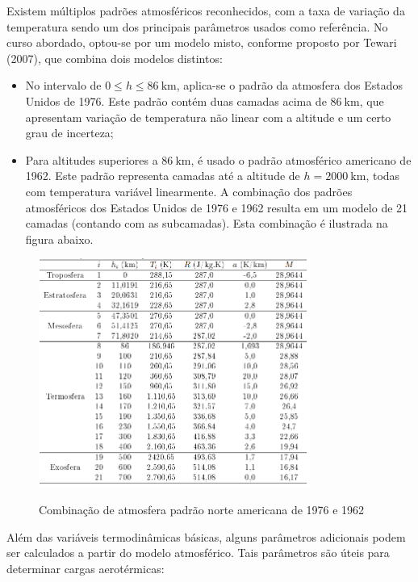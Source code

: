 Existem múltiplos padrões atmosféricos reconhecidos, com a taxa de variação da temperatura sendo um dos principais parâmetros usados como referência. No curso abordado, optou-se por um modelo misto, conforme proposto por Tewari (2007), que combina dois modelos distintos:

\begin{itemize}
\item No intervalo de $0 \leq h \leq 86 \mathrm{~km}$, aplica-se o padrão da atmosfera dos Estados Unidos de 1976. Este padrão contém duas camadas acima de $86 \mathrm{~km}$, que apresentam variação de temperatura não linear com a altitude e um certo grau de incerteza;

\item Para altitudes superiores a $86 \mathrm{~km}$, é usado o padrão atmosférico americano de 1962. Este padrão representa camadas até a altitude de $h=2000 \mathrm{~km}$, todas com temperatura variável linearmente. A combinação dos padrões atmosféricos dos Estados Unidos de 1976 e 1962 resulta em um modelo de 21 camadas (contando com as subcamadas). Esta combinação é ilustrada na figura abaixo.
\end{itemize}

\begin{figure}[h]
    \begin{center}
        \caption{Combinação de atmosfera padrão norte americana de 1976 e 1962}
        \includegraphics[width=3.5in]{figuras/atmos.png}
        \label{fig:atmos}
     \end{center}
\end{figure}

Além das variáveis termodinâmicas básicas, alguns parâmetros adicionais podem ser calculados a partir do modelo atmosférico. Tais parâmetros são úteis para determinar cargas aerotérmicas:

